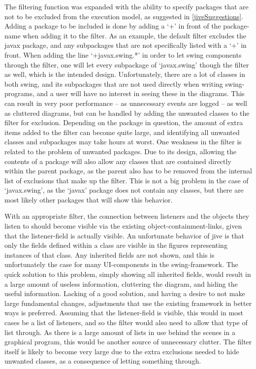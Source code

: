 The filtering function was expanded with the ability to specify packages that are not to be excluded from the execution model, as suggested in \autoref{jiveSuggestions}.
Adding a package to be included is done by adding a `+' in front of the package-name when adding it to the filter.
As an example, the default filter excludes the javax package, and any subpackages that are not specifically listed with a `+' in front.
When adding the line `+javax.swing.*' in order to let swing components through the filter, one will let every subpackage of `javax.swing' though the filter as well, which is the intended design.
Unfortunately, there are a lot of classes in both swing, and its subpackages that are not used directly when writing swing-programs, and a user will have no interest in seeing these in the diagrams.
This can result in very poor performance -- as unnecessary events are logged -- as well as cluttered diagrams, but can be handled by adding the unwanted classes to the filter for exclusion.
Depending on the package in question, the amount of extra items added to the filter can become quite large, and identifying all unwanted classes and subpackages may take hours at worst.
One weakness in the filter is related to the problem of unwanted packages.
Due to its design, allowing the contents of a package will also allow any classes that are contained directly within the parent package, as the parent also has to be removed from the internal list of exclusions that make up the filter.
This is not a big problem in the case of `javax.swing', as the `javax' package does not contain any classes, but there are most likely other packages that will show this behavior.

With an appropriate filter, the connection between listeners and the objects they listen to should become visible via the existing object-containment-links, given that the listener-field is actually visible.
An unfortunate behavior of \gls{jive} is that only the fields defined within a class are visible in the figures representing instances of that class.
Any inherited fields are not shown, and this is unfortunately the case for many UI-components in the swing-framework.
The quick solution to this problem, simply showing all inherited fields, would result in a large amount of useless information, cluttering the diagram, and hiding the useful information.
Lacking of a good solution, and having a desire to not make large fundamental changes, adjustments that use the existing framework in better ways is preferred.
Assuming that the listener-field is visible, this would in most cases be a list of listeners, and so the filter would also need to allow that type of list through.
As there is a large amount of lists in use behind the scenes in a graphical program, this would be another source of unnecessary clutter.
The filter itself is likely to become very large due to the extra exclusions needed to hide unwanted classes, as a consequence of letting something through.

